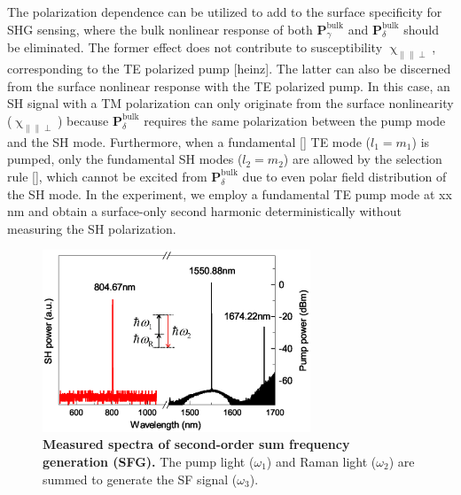 \documentclass[a4paper,8pt,hyperref, twocolumn]{article}
\begin{document}
The polarization dependence can be utilized to add to the surface specificity for SHG sensing, where the bulk nonlinear response of both $\mathbf{P}^{\mathrm{bulk}}_\gamma$ and $\mathbf{P}^{\mathrm{bulk}}_\delta$ should be eliminated.
The former effect does not contribute to susceptibility $\upchi_{\parallel \parallel \perp}$, corresponding to the TE polarized pump [heinz]. 
The latter can also be discerned from the surface nonlinear response with the TE polarized pump.
In this case, an SH signal with a TM polarization can only originate from the surface nonlinearity ($\upchi_{\parallel \parallel \perp}$) because $\mathbf{P}^{\mathrm{bulk}}_\delta$ requires the same polarization between the pump mode and the SH mode.
Furthermore, when a fundamental [] TE mode ($l_1=m_1$) is pumped, only the fundamental SH modes ($l_2=m_2$) are allowed by the selection rule [], which cannot be excited from $\mathbf{P}^{\mathrm{bulk}}_\delta$ due to even polar field distribution of the SH mode.
In the experiment, we employ a fundamental TE pump mode at xx nm and obtain a surface-only second harmonic deterministically without measuring the SH polarization.




\begin{figure}[!ht]
\centering
\includegraphics[width=8cm]{Fig4.eps}
\caption{\textbf{Measured spectra of second-order sum frequency generation (SFG). }The pump light ($\omega_1$) and Raman light ($\omega_2$) are summed to generate the SF signal ($\omega_3$).}
\label{pic:Fig4}
\end{figure}


\end{document}
